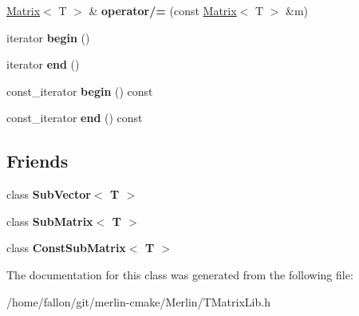 \begin{DoxyCompactItemize}
\item 
\mbox{\label{classTLAS_1_1Matrix_a7d22b9141657c91b5f7b1ff20fb364b8}} 
\hyperlink{classTLAS_1_1Matrix}{Matrix}$<$ T $>$ \& {\bfseries operator/=} (const \hyperlink{classTLAS_1_1Matrix}{Matrix}$<$ T $>$ \&m)
\item 
\mbox{\label{classTLAS_1_1Matrix_aab8dabfb3cceb01b6ad5de1c02b7efd3}} 
iterator {\bfseries begin} ()
\item 
\mbox{\label{classTLAS_1_1Matrix_ace3b72b0677d11b1483513db8640d074}} 
iterator {\bfseries end} ()
\item 
\mbox{\label{classTLAS_1_1Matrix_aba5f8235e3ec082c9dbac1a3c1359832}} 
const\+\_\+iterator {\bfseries begin} () const
\item 
\mbox{\label{classTLAS_1_1Matrix_a6dbe90640f184e494fe5d9b7e9b9d963}} 
const\+\_\+iterator {\bfseries end} () const
\end{DoxyCompactItemize}
\subsection*{Friends}
\begin{DoxyCompactItemize}
\item 
\mbox{\label{classTLAS_1_1Matrix_ae8eafab737fa8fc043dfc78dbbc714e9}} 
class {\bfseries Sub\+Vector$<$ T $>$}
\item 
\mbox{\label{classTLAS_1_1Matrix_a46c149b98c38cb0aa6399812693f1db0}} 
class {\bfseries Sub\+Matrix$<$ T $>$}
\item 
\mbox{\label{classTLAS_1_1Matrix_a5ef9f387b06b0e81e2c5f80d51947abe}} 
class {\bfseries Const\+Sub\+Matrix$<$ T $>$}
\end{DoxyCompactItemize}


The documentation for this class was generated from the following file\+:\begin{DoxyCompactItemize}
\item 
/home/fallon/git/merlin-\/cmake/\+Merlin/T\+Matrix\+Lib.\+h\end{DoxyCompactItemize}
